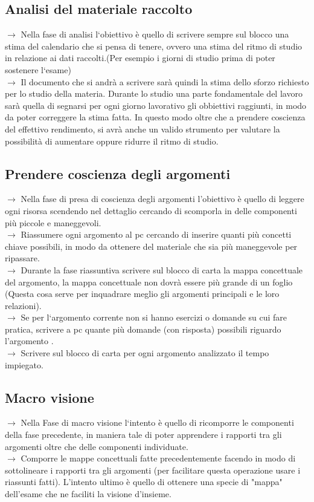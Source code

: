 \documentclass[11pt,a4paper]{article}
\begin{document}
\subsection{Analisi del materiale raccolto}
$\rightarrow$ Nella fase di analisi l`obiettivo è quello di scrivere sempre sul blocco una stima del calendario che si pensa di tenere, ovvero una stima del ritmo di studio in relazione ai dati raccolti.(Per esempio i giorni di studio prima di poter sostenere l`esame)\\
$\rightarrow$ Il documento che si andrà a scrivere sarà quindi la stima dello sforzo richiesto per lo studio della materia.
 Durante lo studio una parte fondamentale del lavoro sarà quella di segnarsi per ogni giorno lavorativo gli obbiettivi raggiunti, in modo da poter correggere la stima fatta. In questo modo oltre che a prendere coscienza del effettivo rendimento, si avrà anche un valido strumento per valutare la possibilità di aumentare oppure ridurre il ritmo di studio.\\

\subsection{Prendere coscienza degli argomenti}
$\rightarrow$ Nella fase di presa di coscienza degli argomenti l'obiettivo è quello di leggere ogni risorsa scendendo nel dettaglio cercando di scomporla in delle componenti più piccole e maneggevoli.\\
$\rightarrow$ Riassumere ogni argomento al pc cercando di inserire quanti più concetti chiave possibili, in modo da ottenere del materiale che sia più maneggevole per ripassare.\\
$\rightarrow$ Durante la fase riassuntiva scrivere sul blocco di carta la mappa concettuale del argomento, la mappa concettuale non dovrà essere più grande di un foglio (Questa cosa serve per inquadrare meglio gli argomenti principali e le loro relazioni).\\
$\rightarrow$ Se per l`argomento corrente non si hanno esercizi o domande su cui fare pratica, scrivere a pc quante più domande (con risposta) possibili riguardo l'argomento .\\
$\rightarrow$ Scrivere sul blocco di carta per ogni argomento analizzato il tempo impiegato.\\

\subsection{Macro visione}
$\rightarrow$ Nella Fase di macro visione l`intento è quello di ricomporre le componenti della fase precedente, in maniera tale di poter apprendere i rapporti tra gli argomenti oltre che delle componenti individuate.\\
$\rightarrow$ Comporre le mappe concettuali fatte precedentemente facendo in modo di sottolineare i rapporti tra gli argomenti (per facilitare questa operazione usare i riassunti fatti). L'intento ultimo è quello di ottenere una specie di "mappa" dell'esame che ne faciliti la visione d'insieme. \\
\end{document}
